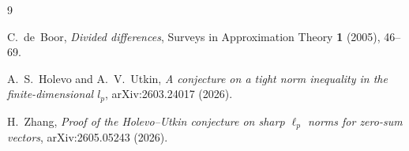 \documentclass[11pt]{amsart}
\theoremstyle{remark}
\begin{document}
\begin{thebibliography}{9}

C.~de~Boor, \emph{Divided differences}, Surveys in Approximation Theory \textbf{1}
(2005), 46--69.

A.~S.~Holevo and A.~V.~Utkin, \emph{A conjecture on a tight norm inequality in the
finite-dimensional $l_p$}, arXiv:2603.24017 (2026).

H.~Zhang, \emph{Proof of the Holevo--Utkin conjecture on sharp $\ell_p$ norms for
zero-sum vectors}, arXiv:2605.05243 (2026).

\end{thebibliography}
\end{document}
